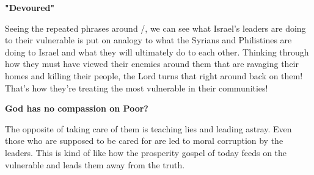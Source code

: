 \documentclass[11pt]{article}
\begin{document}
\newpage
{\large\bfseries "Devoured"}
\vspace{1em}

Seeing the repeated phrases around /, we can see what Israel's leaders are doing to their vulnerable is put on analogy to what the Syrians and Philistines are doing to Israel and what they will ultimately do to each other. Thinking through how they must have viewed their enemies around them that are ravaging their homes and killing their people, the Lord turns that right around back on them! That's how they're treating the most vulnerable in their communities!


\vspace{3em}
{\large\bfseries God has no compassion on Poor?}
\vspace{1em}

The opposite of taking care of them is teaching lies and leading astray. Even those who are supposed to be cared for are led to moral corruption by the leaders. This is kind of like how the prosperity gospel of today feeds on the vulnerable and leads them away from the truth.

\begin{biblicaloutline}[Isaiah 9:18-21]

    \begin{versesection}{2em}
    \end{versesection}

\end{biblicaloutline}
\end{document}
